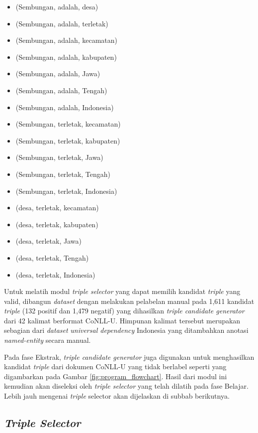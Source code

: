 \begin{itemize}
\item (Sembungan, adalah, desa) 
\item (Sembungan, adalah, terletak)
\item (Sembungan, adalah, kecamatan)
\item (Sembungan, adalah, kabupaten)
\item (Sembungan, adalah, Jawa)
\item (Sembungan, adalah, Tengah)
\item (Sembungan, adalah, Indonesia)
\item (Sembungan, terletak, kecamatan) 
\item (Sembungan, terletak, kabupaten) 
\item (Sembungan, terletak, Jawa) 
\item (Sembungan, terletak, Tengah)
\item (Sembungan, terletak, Indonesia) 
\item (desa, terletak, kecamatan)
\item (desa, terletak, kabupaten)
\item (desa, terletak, Jawa)
\item (desa, terletak, Tengah)
\item (desa, terletak, Indonesia)
\end{itemize}

Untuk melatih modul \textit{triple selector} yang dapat memilih kandidat \textit{triple} yang valid, dibangun \textit{dataset} dengan melakukan pelabelan manual pada 1,611 kandidat \textit{triple} (132 positif dan 1,479 negatif) yang dihasilkan \textit{triple candidate generator} dari 42 kalimat berformat CoNLL-U. Himpunan kalimat tersebut merupakan sebagian dari \textit{dataset} \textit{universal dependency} Indonesia yang ditambahkan anotasi \textit{named-entity} secara manual.

Pada fase Ekstrak, \textit{triple candidate generator} juga digunakan untuk menghasilkan kandidat \textit{triple} dari dokumen CoNLL-U yang tidak berlabel seperti yang digambarkan pada Gambar \ref{fig:program_flowchart}. Hasil dari modul ini kemudian akan diseleksi oleh \textit{triple selector} yang telah dilatih pada fase Belajar. Lebih jauh mengenai \textit{triple} selector akan dijelaskan di subbab berikutnya.

\subsection{\textit{Triple Selector}}  \label{Triple Selector}

